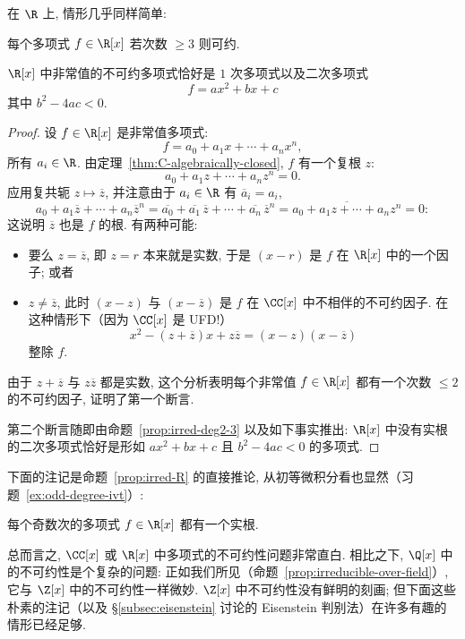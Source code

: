 在 $\R$ 上, 情形几乎同样简单:

\begin{proposition}\label{prop:irred-R}
每个多项式 $f\in\R[x]$ 若次数 $\geq 3$ 则可约.

$\R[x]$ 中非常值的不可约多项式恰好是 $1$ 次多项式以及二次多项式
\[
f=ax^2+bx+c
\]
其中 $b^2-4ac<0$.
\end{proposition}

\begin{proof}
设 $f\in\R[x]$ 是非常值多项式:
\[
f=a_0+a_1x+\cdots+a_nx^n,
\]
所有 $a_i\in\R$. 由定理~\ref{thm:C-algebraically-closed}, $f$ 有一个复根 $z$:
\[
a_0+a_1z+\cdots+a_nz^n=0.
\]
应用复共轭 $z\mapsto\overline{z}$, 并注意由于 $a_i\in\R$ 有 $\overline{a}_i=a_i$,
\[
a_0+a_1\overline{z}+\cdots+a_n\overline{z}^n
=\overline{a_0}+\overline{a_1}\,\overline{z}+\cdots+\overline{a_n}\,\overline{z}^n
=\overline{a_0+a_1z+\cdots+a_nz^n}=0:
\]
这说明 $\overline{z}$ 也是 $f$ 的根. 有两种可能:
\begin{itemize}
\item 要么 $z=\overline{z}$, 即 $z=r$ 本来就是实数, 于是 $(x-r)$ 是 $f$ 在 $\R[x]$ 中的一个因子; 或者
\item $z\neq\overline{z}$, 此时 $(x-z)$ 与 $(x-\overline{z})$ 是 $f$ 在 $\CC[x]$ 中不相伴的不可约因子. 在这种情形下（因为 $\CC[x]$ 是 UFD!）
\[
x^2-(z+\overline{z})x+z\overline{z}=(x-z)(x-\overline{z})
\]
整除 $f$.
\end{itemize}
由于 $z+\overline{z}$ 与 $z\overline{z}$ 都是实数, 这个分析表明每个非常值 $f\in\R[x]$ 都有一个次数 $\leq 2$ 的不可约因子, 证明了第一个断言.

第二个断言随即由命题~\ref{prop:irred-deg2-3} 以及如下事实推出: $\R[x]$ 中没有实根的二次多项式恰好是形如 $ax^2+bx+c$ 且 $b^2-4ac<0$ 的多项式.
\end{proof}

下面的注记是命题~\ref{prop:irred-R} 的直接推论, 从初等微积分看也显然（习题~\ref{ex:odd-degree-ivt}）:

\begin{corollary}\label{cor:odd-degree-real-root}
每个奇数次的多项式 $f\in\R[x]$ 都有一个实根.
\end{corollary}

总而言之, $\CC[x]$ 或 $\R[x]$ 中多项式的不可约性问题非常直白. 相比之下, $\Q[x]$ 中的不可约性是个复杂的问题: 正如我们所见（命题~\ref{prop:irreducible-over-field}）, 它与 $\Z[x]$ 中的不可约性一样微妙. $\Z[x]$ 中不可约性没有鲜明的刻画; 但下面这些朴素的注记（以及 \S\ref{subsec:eisenstein} 讨论的 Eisenstein 判别法）在许多有趣的情形已经足够.

